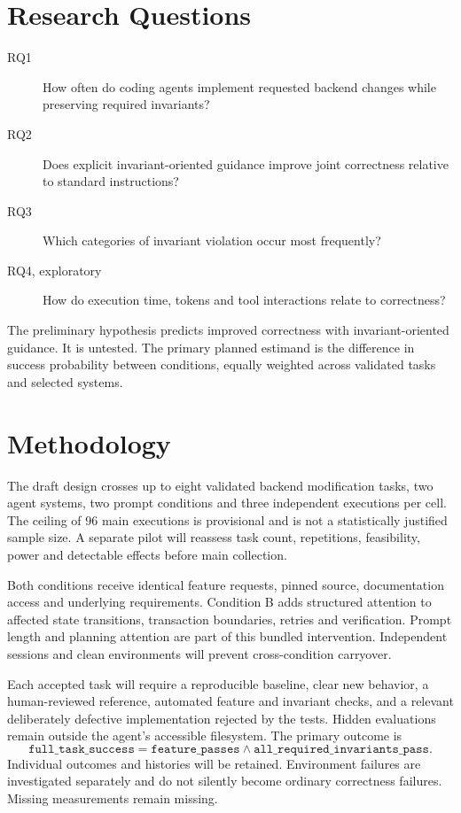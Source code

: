 \section{Research Questions}
\begin{description}
\item[RQ1] How often do coding agents implement requested backend changes while preserving required invariants?
\item[RQ2] Does explicit invariant-oriented guidance improve joint correctness relative to standard instructions?
\item[RQ3] Which categories of invariant violation occur most frequently?
\item[RQ4, exploratory] How do execution time, tokens and tool interactions relate to correctness?
\end{description}
The preliminary hypothesis predicts improved correctness with invariant-oriented guidance. It is
untested. The primary planned estimand is the difference in success probability between conditions,
equally weighted across validated tasks and selected systems.

\section{Methodology}
The draft design crosses up to eight validated backend modification tasks, two agent systems, two
prompt conditions and three independent executions per cell. The ceiling of 96 main executions is
provisional and is not a statistically justified sample size. A separate pilot will reassess task count,
repetitions, feasibility, power and detectable effects before main collection.

Both conditions receive identical feature requests, pinned source, documentation access and underlying
requirements. Condition B adds structured attention to affected state transitions, transaction
boundaries, retries and verification. Prompt length and planning attention are part of this bundled
intervention. Independent sessions and clean environments will prevent cross-condition carryover.

Each accepted task will require a reproducible baseline, clear new behavior, a human-reviewed reference,
automated feature and invariant checks, and a relevant deliberately defective implementation rejected
by the tests. Hidden evaluations remain outside the agent's accessible filesystem. The primary outcome is
\[
\texttt{full\_task\_success} =
\texttt{feature\_passes} \land \texttt{all\_required\_invariants\_pass}.
\]
Individual outcomes and histories will be retained. Environment failures are investigated separately
and do not silently become ordinary correctness failures. Missing measurements remain missing.


